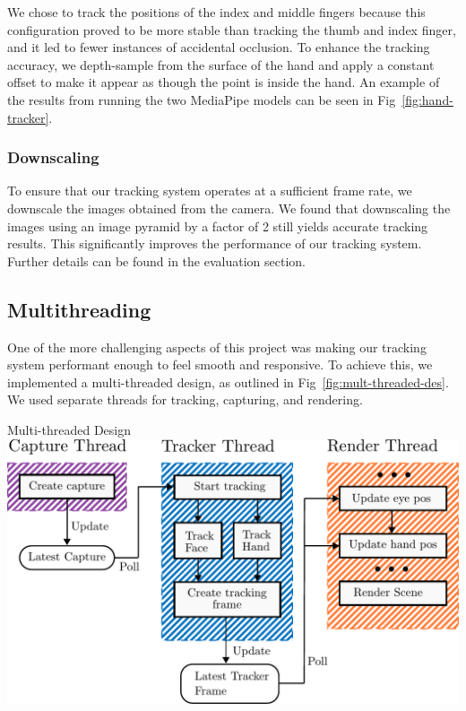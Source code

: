We chose to track the positions of the index and middle fingers because this configuration proved to be more stable than tracking the thumb and index finger, and it led to fewer instances of accidental occlusion. To enhance the tracking accuracy, we depth-sample from the surface of the hand and apply a constant offset to make it appear as though the point is inside the hand. An example of the results from running the two MediaPipe models can be seen in Fig~\ref{fig:hand-tracker}.

\subsubsection*{Downscaling}
To ensure that our tracking system operates at a sufficient frame rate, we downscale the images obtained from the camera. We found that downscaling the images using an image pyramid \cite{adelson1984pmi} by a factor of 2 still yields accurate tracking results. This significantly improves the performance of our tracking system. Further details can be found in the evaluation section.


\subsection{Multithreading}

One of the more challenging aspects of this project was making our tracking system performant enough to feel smooth and responsive. To achieve this, we implemented a multi-threaded design, as outlined in Fig~\ref{fig:mult-threaded-des}. We used separate threads for tracking, capturing, and rendering.

\begin{figureBox}[label={fig:mult-threaded-des}, width=0.75\linewidth]{Multi-threaded Design}
    \includegraphics[width=1.0\linewidth]{./implementation/figures/multi-thread-design.pdf}
\end{figureBox}

